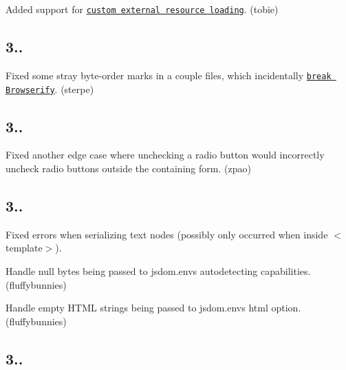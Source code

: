 \begin{DoxyItemize}
\item Added support for \href{https://github.com/tmpvar/jsdom#custom-external-resource-loader}{\tt custom external resource loading}. (tobie)
\end{DoxyItemize}

\subsection*{3..}


\begin{DoxyItemize}
\item Fixed some stray byte-\/order marks in a couple files, which incidentally \href{https://github.com/substack/node-browserify/issues/1095}{\tt break Browserify}. (sterpe)
\end{DoxyItemize}

\subsection*{3..}


\begin{DoxyItemize}
\item Fixed another edge case where unchecking a radio button would incorrectly uncheck radio buttons outside the containing form. (zpao)
\end{DoxyItemize}

\subsection*{3..}


\begin{DoxyItemize}
\item Fixed errors when serializing text nodes (possibly only occurred when inside {\ttfamily $<$template$>$}).
\item Handle null bytes being passed to {\ttfamily jsdom.\+env}\textquotesingle{}s autodetecting capabilities. (fluffybunnies)
\item Handle empty H\+T\+ML strings being passed to {\ttfamily jsdom.\+env}\textquotesingle{}s {\ttfamily html} option. (fluffybunnies)
\end{DoxyItemize}

\subsection*{3..}


